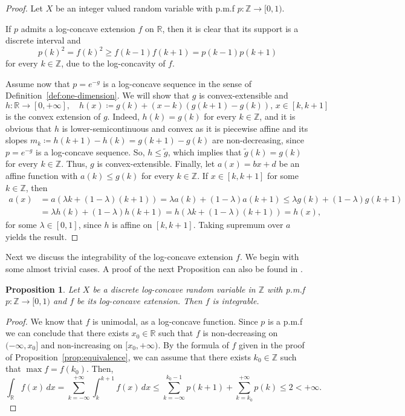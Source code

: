 \documentclass[11pt,a4paper]{article} %
\newtheorem{proposition}[theorem]{Proposition}
\theoremstyle{definition}
\theoremstyle{remark}
\newcommand{\1}{\mathds{1}}
\begin{document}
\begin{proof}
    Let $X$ be an integer valued random variable with p.m.f $p: \mathbb{Z} \to [0,1).$
    
    If $p$ admits a log-concave extension $f$ on $\mathbb{R}$, then it is clear that its support is a discrete interval and $$p(k)^2=f(k)^2 \geq f(k-1)f(k+1)=p(k-1)p(k+1)$$ for every $k \in \mathbb{Z}$, due to the log-concavity of $f$.
    
    Assume now that $p=e^{-g}$ is a log-concave sequence in the sense of Definition~\ref{def:one-dimension}. We will show that $g$ is convex-extensible and $$h: \mathbb{R} \to [0,+\infty], \quad h(x)\coloneqq g(k)+(x-k)\left(g(k+1)-g(k)\right) , \, x \in [k,k+1]$$ is the convex extension of $g$. Indeed, $h(k)=g(k)$ for every $k \in \mathbb{Z}$, and it is obvious that $h$ is lower-semicontinuous and convex as it is piecewise affine and its slopes $m_k \coloneqq h(k+1)-h(k)=g(k+1)-g(k)$ are non-decreasing, since $p=e^{-g}$ is a log-concave sequence. So, $h \leq \tilde{g}$, which implies that $\tilde{g}(k)=g(k)$ for every $k \in \mathbb{Z}$. Thus, $g$ is convex-extensible. Finally, let $a(x)=bx+d$ be an affine function with $a(k) \leq g(k)$ for every $k \in \mathbb{Z}$. If $x \in [k,k+1]$ for some $k \in \mathbb{Z}$, then 
    \begin{align*}   
    a(x)&=a(\lambda k+(1-\lambda)(k+1))=\lambda a(k)+(1-\lambda)a(k+1) \leq \lambda g(k) +(1-\lambda)g(k+1)\\
    &= \lambda h(k) +(1-\lambda)h(k+1)=h(\lambda k +(1-\lambda)(k+1))=h(x),
    \end{align*}
    for some $\lambda \in [0,1]$, since $h$ is affine on $[k,k+1]$. Taking supremum over $a$ yields the result.
\end{proof}

Next we discuss the integrability of the log-concave extension $f$. We begin with some almost trivial cases. A proof of the next Proposition can also be found in \cite[Proposition 5.1]{BMaMe}.

\begin{proposition}\label{prop:one-dim-integr}
    Let $X$ be a discrete log-concave random variable in $\mathbb{Z}$ with p.m.f $p : \mathbb{Z} \to [0,1)$ and $f$ be its log-concave extension. Then $f$ is integrable.
\end{proposition}

\begin{proof}
We know that $f$ is unimodal, as a log-concave function. Since $p$ is a p.m.f we can conclude that there exists $x_0 \in \mathbb{R}$ such that $f$ is non-decreasing on $(-\infty,x_0]$ and non-increasing on $[x_0,+\infty)$. By the formula of $f$ given in the proof of Proposition~\ref{prop:equivalence}, we can assume that there exists $k_0 \in \mathbb{Z}$ such that $\max f=f(k_0)$. Then, $$\int_{\mathbb{R}} f(x) \, dx= \sum\limits_{k=-\infty}^{+\infty} \int_{k}^{k+1} f(x) \, dx \leq \sum\limits_{k=-\infty}^{k_0-1} p(k+1) + \sum\limits_{k=k_0}^{+\infty}p(k) \leq 2 <+\infty.$$ 
\end{proof}
\end{document}

